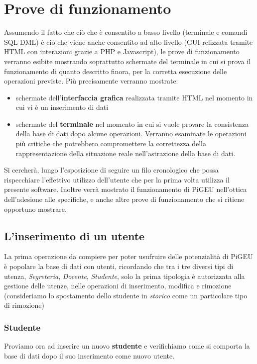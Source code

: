 \documentclass{article}
\begin{document}
\section{Prove di funzionamento}
Assumendo il fatto che ciò che è consentito a basso livello (terminale e comandi SQL-DML) è ciò che viene anche consentito ad alto livello (GUI relizzata tramite HTML con interazioni grazie a PHP e Javascript), le prove di funzionamento verranno esibite mostrando soprattutto schermate del terminale in cui si prova il funzionamento di quanto descritto finora, per la corretta esecuzione delle operazioni previste. Più precisamente verranno mostrate:
\begin{itemize}
    \item schermate dell'\textbf{interfaccia grafica} realizzata tramite HTML nel momento in cui vi è un inserimento di dati
    \item schermate del \textbf{terminale} nel momento in cui si vuole provare la consistenza della base di dati dopo alcune operazioni. Verranno esaminate le operazioni più critiche che potrebbero compromettere la correttezza della rappresentazione della situazione reale nell'astrazione della base di dati.
\end{itemize}
Si cercherà, lungo l'esposizione di seguire un filo cronologico che possa rispecchiare l'effettivo utilizzo dell'utente che per la prima volta utilizza il presente software. Inoltre verrà mostrato il funzionamento di PiGEU nell'ottica dell'adesione alle specifiche, e anche altre prove di funzionamento che si ritiene opportuno mostrare.
\subsection{L'inserimento di un utente}
La prima operazione da compiere per poter usufruire delle potenzialità di PiGEU è popolare la base di dati con utenti, ricordando che tra i tre diversi tipi di utenza, \textit{Segreteria}, \textit{Docente}, \textit{Studente}, solo la prima tipologia è autorizzata alla gestione delle utenze, nelle operazioni di inserimento, modifica e rimozione (consideriamo lo spostamento dello studente in \textit{storico} come un particolare tipo di rimozione)
\subsubsection{Studente}
Proviamo ora ad inserire un nuovo \textbf{studente} e verifichiamo come si comporta la base di dati dopo il suo inserimento come nuovo utente.
\end{document}
